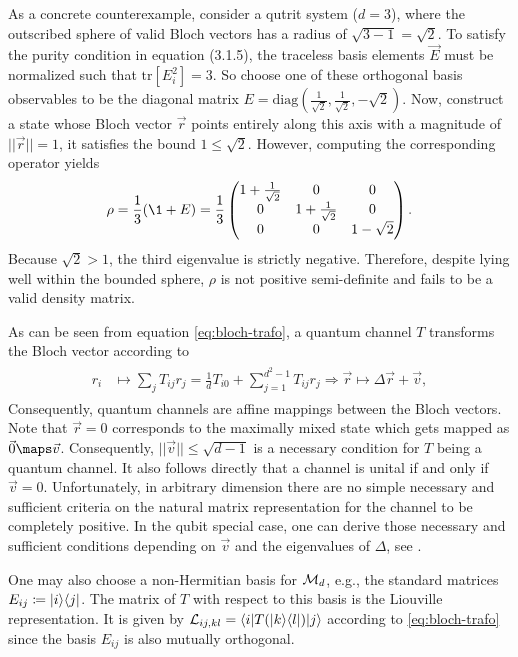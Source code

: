 As a concrete counterexample, consider a qutrit system ($d=3$), where the outscribed sphere of valid Bloch vectors has a radius of $\sqrt{3-1} = \sqrt{2}$. To satisfy the purity condition in equation (3.1.5), the traceless basis elements $\vec{E}$ must be normalized such that $\text{tr}[E_i^2] = 3$. So choose one of these orthogonal basis observables to be the diagonal matrix $E = \text{diag}(\frac{1}{\sqrt{2}}, \frac{1}{\sqrt{2}}, -\sqrt{2})$. Now, construct a state whose Bloch vector $\vec{r}$ points entirely along this axis with a magnitude of $||\vec{r}|| = 1$, it satisfies the bound $1 \le \sqrt{2}$. However, computing the corresponding operator yields
\begin{align}
\rho = \frac{1}{3}(\1 + E) = \frac{1}{3} \begin{pmatrix} 1 + \frac{1}{\sqrt{2}} & 0 & 0 \\ 0 & 1 + \frac{1}{\sqrt{2}} & 0 \\ 0 & 0 & 1 - \sqrt{2} \end{pmatrix}.
\end{align}
Because $\sqrt{2} > 1$, the third eigenvalue is strictly negative. Therefore, despite lying well within the bounded sphere, $\rho$ is not positive semi-definite and fails to be a valid density matrix.


As can be seen from equation \eqref{eq:bloch-trafo}, a quantum channel $T$ transforms the Bloch vector according to 
\begin{align}
\begin{split}
    r_i &\mapsto \sum_j T_{ij}r_j = \frac{1}{d}T_{i0}+ \sum_{j=1}^{d^2-1}T_{ij}r_j
    \Rightarrow \vec r \mapsto  \Delta\vec r+\vec v,
    \end{split}
\end{align}
Consequently, quantum channels are affine mappings between the Bloch vectors. Note that $\vec r = 0$ corresponds to the maximally mixed state which gets mapped as $\vec 0 \maps \vec v$. Consequently, $\vert \vert \vec v \vert \vert \leq \sqrt{d-1}$ is a necessary condition for $T$ being a quantum channel. It also follows directly that a channel is unital if and only if $\vec v = 0$. Unfortunately, in arbitrary dimension there are no simple necessary and sufficient criteria on the natural matrix representation for the channel to be completely positive. In the qubit special case, one can derive those necessary and sufficient conditions depending on $\vec v$ and the eigenvalues of $\Delta$, see \cite{ruskai}.

One may also choose a non-Hermitian basis for $\mathcal M_d$, e.g., the standard matrices $E_{ij}\coloneqq \lvert i\rangle\langle j\rvert$. The matrix of $T$ with respect to this basis is the Liouville representation. It is given by $\mathcal L_{ij,kl}=\langle i\rvert T(\lvert k\rangle\langle l\rvert)\lvert j\rangle$
according to \eqref{eq:bloch-trafo} since the basis $E_{ij}$ is also mutually orthogonal.



